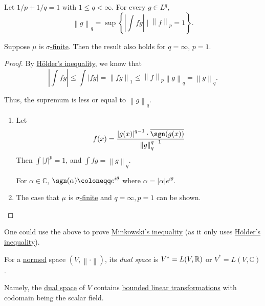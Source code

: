 \begin{proposition}\label{prop:Lp-dual-formula}
	Let \(1/p + 1/q = 1\) with \(1 \leq q < \infty\). For every \(g \in L^q\),
	\[
		\left\lVert g\right\rVert_q = \sup\left\{\left\vert \int fg \right\vert  \mid \left\lVert f\right\rVert_p = 1\right\}.
	\]

	Suppose \(\mu \) is \hyperref[def:finite-measure]{\(\sigma\)-finite}. Then the result also holds for \(q = \infty\), \(p = 1\).
\end{proposition}
\begin{proof}
	By \hyperref[thm:Holder-inequality]{Hölder's inequality}, we know that
	\[
		\left\vert \int fg \right\vert  \leq \int \left\vert fg \right\vert  = \left\lVert fg\right\rVert_1 \leq \left\lVert f\right\rVert _p \left\lVert g\right\rVert_q = \left\lVert g\right\rVert_q.
	\]

	Thus, the supremum is less or equal to \(\left\lVert g\right\rVert_q\).

	\begin{enumerate}
		\item Let
		      \[
			      f(x) = \frac{\left\vert g(x) \right\vert ^{q-1}\cdot \overline{\sgn(g(x))}}{\left\lVert g\right\rVert_q^{q-1}}
		      \]
		      Then \(\int \left\vert f \right\vert ^p = 1\), and \(\int fg = \left\lVert g\right\rVert _q\).
		      \begin{note}
			      For \(\alpha \in \mathbb{C}\), \(\sgn (\alpha) \coloneqq e^{i\theta}\) where \(\alpha = \left\vert \alpha \right\vert e^{i\theta}\).
		      \end{note}
		\item The case that \(\mu\) is \hyperref[def:finite-measure]{\(\sigma\)-finite} and \(q = \infty, p = 1\) can be shown.
	\end{enumerate}
\end{proof}

\begin{remark}
	One could use the above to prove \hyperref[thm:Minkowski-inequality]{Minkowski's inequality} (as it only uses \hyperref[thm:Holder-inequality]{Hölder's inequality}).
\end{remark}

\begin{definition}\label{def:dual-space}
	For a \hyperref[def:norm]{normed} space \((V, \left\lVert \cdot\right\rVert )\), its \emph{dual space} is \(V^\ast = L(V, \mathbb{\MakeUppercase{r}} )\) or
	\(V^\ast = L(V, \mathbb{C})\).
\end{definition}
\begin{remark}
	Namely, the \hyperref[def:dual-space]{dual space} of \(V\) contains \hyperref[def:bounded-linear-transformation]{bounded linear transformations} with codomain being the scalar field.
\end{remark}

